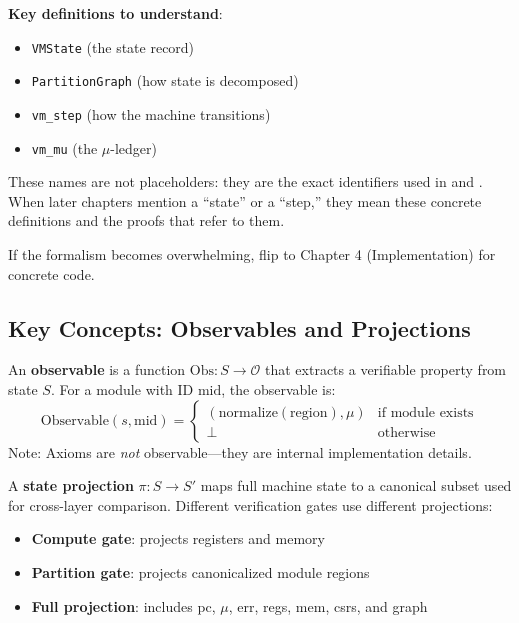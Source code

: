 \textbf{Key definitions to understand}:
\begin{itemize}
    \item \texttt{VMState} (the state record)
    \item \texttt{PartitionGraph} (how state is decomposed)
    \item \texttt{vm\_step} (how the machine transitions)
    \item \texttt{vm\_mu} (the $\mu$-ledger)
\end{itemize}
These names are not placeholders: they are the exact identifiers used in  and . When later chapters mention a “state” or a “step,” they mean these concrete definitions and the proofs that refer to them.

If the formalism becomes overwhelming, flip to Chapter 4 (Implementation) for concrete code.

\subsection{Key Concepts: Observables and Projections}

\begin{tcolorbox}[colback=green!5!white,colframe=green!75!black,title=\textbf{Observables and State Projections}]
\begin{definition}[Observable]
An \textbf{observable} is a function $\text{Obs}: S \to \mathcal{O}$ that extracts a verifiable property from state $S$. For a module with ID $\text{mid}$, the observable is:
\[
\text{Observable}(s, \text{mid}) = \begin{cases}
(\text{normalize}(\text{region}), \mu) & \text{if module exists} \\
\bot & \text{otherwise}
\end{cases}
\]
Note: Axioms are \emph{not} observable---they are internal implementation details.
\end{definition}

\begin{definition}
A \textbf{state projection} $\pi: S \to S'$ maps full machine state to a canonical subset used for cross-layer comparison. Different verification gates use different projections:
\begin{itemize}
    \item \textbf{Compute gate}: projects registers and memory
    \item \textbf{Partition gate}: projects canonicalized module regions
    \item \textbf{Full projection}: includes pc, $\mu$, err, regs, mem, csrs, and graph
\end{itemize}
\end{definition}
\end{tcolorbox}

